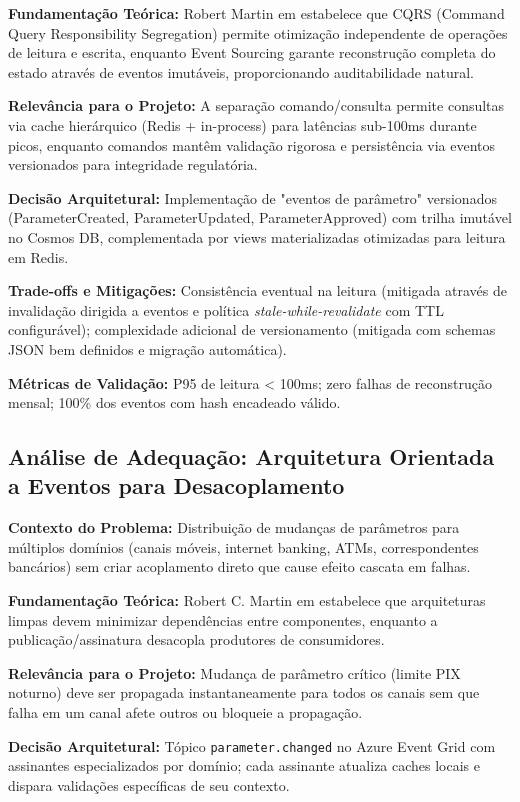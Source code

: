 \textbf{Fundamentação Teórica:} Robert Martin em  estabelece que CQRS (Command Query Responsibility Segregation) permite otimização independente de operações de leitura e escrita, enquanto Event Sourcing garante reconstrução completa do estado através de eventos imutáveis, proporcionando auditabilidade natural.

\textbf{Relevância para o Projeto:} A separação comando/consulta permite consultas via cache hierárquico (Redis + in-process) para latências sub-100ms durante picos, enquanto comandos mantêm validação rigorosa e persistência via eventos versionados para integridade regulatória.

\textbf{Decisão Arquitetural:} Implementação de "eventos de parâmetro" versionados (ParameterCreated, ParameterUpdated, ParameterApproved) com trilha imutável no Cosmos DB, complementada por views materializadas otimizadas para leitura em Redis.

\textbf{Trade-offs e Mitigações:} Consistência eventual na leitura (mitigada através de invalidação dirigida a eventos e política \textit{stale-while-revalidate} com TTL configurável); complexidade adicional de versionamento (mitigada com schemas JSON bem definidos e migração automática).

\textbf{Métricas de Validação:} P95 de leitura < 100ms; zero falhas de reconstrução mensal; 100\% dos eventos com hash encadeado válido.

\subsection{Análise de Adequação: Arquitetura Orientada a Eventos para Desacoplamento}

\textbf{Contexto do Problema:} Distribuição de mudanças de parâmetros para múltiplos domínios (canais móveis, internet banking, ATMs, correspondentes bancários) sem criar acoplamento direto que cause efeito cascata em falhas.

\textbf{Fundamentação Teórica:} Robert C. Martin em  estabelece que arquiteturas limpas devem minimizar dependências entre componentes, enquanto a publicação/assinatura desacopla produtores de consumidores.

\textbf{Relevância para o Projeto:} Mudança de parâmetro crítico (limite PIX noturno) deve ser propagada instantaneamente para todos os canais sem que falha em um canal afete outros ou bloqueie a propagação.

\textbf{Decisão Arquitetural:} Tópico \texttt{parameter.changed} no Azure Event Grid com assinantes especializados por domínio; cada assinante atualiza caches locais e dispara validações específicas de seu contexto.

